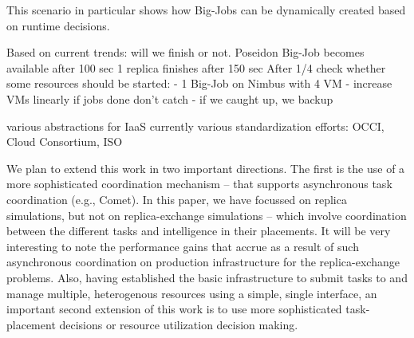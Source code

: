 \documentclass[conference,final]{IEEEtran}
\begin{document}
This scenario in particular shows how Big-Jobs can be dynamically created based
on runtime decisions.


Based on current trends: will we finish or not.
Poseidon Big-Job becomes available after 100 sec
1 replica finishes after 150 sec
After 1/4 check whether some resources should be started:
- 1 Big-Job on Nimbus with 4 VM
- increase VMs linearly if jobs done don't catch
- if we caught up, we backup



various abstractions for IaaS currently
various standardization efforts: OCCI, Cloud Consortium, ISO

We plan to extend this work in two important directions. The first is
the use of a more sophisticated coordination mechanism -- that
supports asynchronous task coordination (e.g., Comet). In this paper,
we have focussed on replica simulations, but not on replica-exchange
simulations -- which involve coordination between the different tasks
and intelligence in their placements.  It will be very interesting to
note the performance gains that accrue as a result of such
asynchronous coordination on production infrastructure for the
replica-exchange problems. Also, having established the basic
infrastructure to submit tasks to and manage multiple, heterogenous
resources using a simple, single interface, an important second
extension of this work is to use more sophisticated task-placement
decisions or resource utilization decision making.



\end{document}
